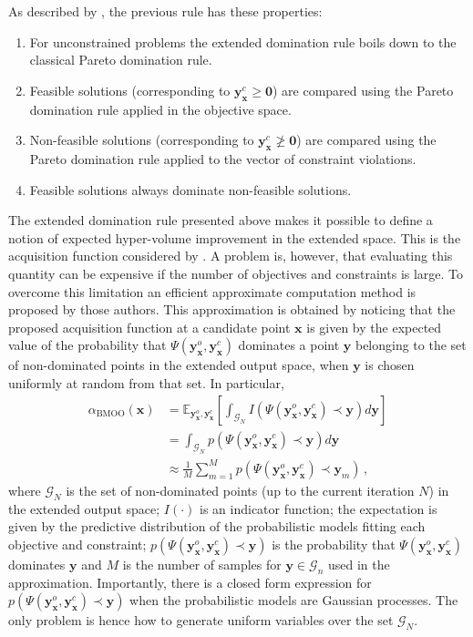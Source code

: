 \documentclass[review,preprint,12pt]{elsarticle}
\begin{document}
As described by \cite{feliot2015bayesian}, the previous rule has these properties:
\begin{enumerate}
\item For unconstrained problems the extended domination rule boils down to the classical Pareto domination rule.
\item Feasible solutions (corresponding to $\mathbf{y}^c_\mathbf{x} \geq \mathbf{0}$) are compared using the 
	Pareto domination rule applied in the objective space.
\item Non-feasible solutions (corresponding to $\mathbf{y}^c_\mathbf{x} \ngeq \mathbf{0}$)
	 are compared using the Pareto domination rule applied to the vector of constraint violations.
\item Feasible solutions always dominate non-feasible solutions.
\end{enumerate}

The extended domination rule presented above makes it possible to define a notion of expected hyper-volume
improvement in the extended space. This is the acquisition function considered by \cite{feliot2015bayesian}.
A problem is, however, that evaluating this quantity can be expensive if the number of objectives and constraints 
is large. To overcome this limitation an efficient approximate computation method is proposed by those authors.
This approximation is obtained by noticing that the proposed acquisition function at a candidate point $\mathbf{x}$ 
is given by the expected value of the probability that $\Psi(\mathbf{y}_\mathbf{x}^o,\mathbf{y}_\mathbf{x}^c)$
dominates a point $\mathbf{y}$ belonging to the set of non-dominated points in the extended output space, 
when $\mathbf{y}$ is chosen uniformly at random from that set. In particular,
\begin{align}
\alpha_\text{BMOO}(\mathbf{x}) &= \mathds{E}_{\mathbf{y}_\mathbf{x}^o,\mathbf{y}_\mathbf{x}^c}\left[ \int_{\mathcal{G}_N} 
	I(\Psi(\mathbf{y}_\mathbf{x}^o,\mathbf{y}_\mathbf{x}^c) \prec \mathbf{y}) d \mathbf{y} \right]
	\nonumber \\
	& =  \int_{\mathcal{G}_N} p(\Psi(\mathbf{y}_\mathbf{x}^o,\mathbf{y}_\mathbf{x}^c) \prec \mathbf{y}) d \mathbf{y}
	\nonumber \\
	& \approx \frac{1}{M} \sum_{m=1}^M  p(\Psi(\mathbf{y}_\mathbf{x}^o,\mathbf{y}_\mathbf{x}^c) \prec \mathbf{y}_m)
	\,,
	\label{eq:acc_bmoo}
\end{align}
where $\mathcal{G}_N$ is the set of non-dominated points (up to the current iteration $N$) in the 
extended output space; $I(\cdot)$ is an indicator function;
the expectation is given by the predictive distribution of the probabilistic models fitting each objective and constraint;
$p(\Psi(\mathbf{y}_\mathbf{x}^o,\mathbf{y}_\mathbf{x}^c) \prec \mathbf{y})$ is the probability that
$\Psi(\mathbf{y}_\mathbf{x}^o,\mathbf{y}_\mathbf{x}^c)$ dominates $\mathbf{y}$ and $M$ is the number of samples for 
$\mathbf{y} \in \mathcal{G}_n$ used in the approximation. Importantly, there is a closed form expression for 
$p(\Psi(\mathbf{y}_\mathbf{x}^o,\mathbf{y}_\mathbf{x}^c) \prec \mathbf{y})$ when the probabilistic 
models are Gaussian processes. The only problem is hence how to generate uniform variables over the set $\mathcal{G}_N$.
\end{document}
